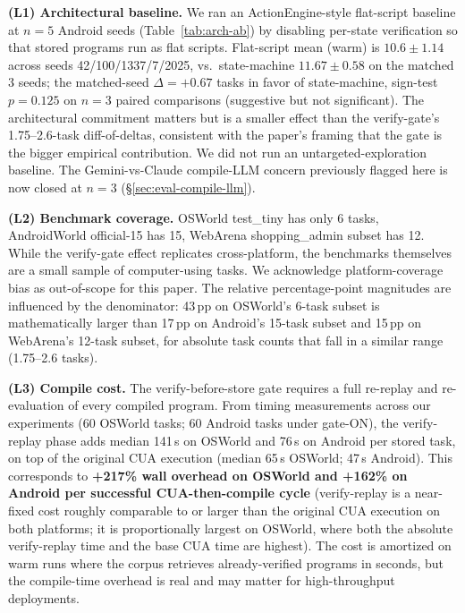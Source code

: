 \documentclass[11pt]{article}
\begin{document}
\textbf{(L1) Architectural baseline.} We ran an ActionEngine-style flat-script baseline at $n{=}5$ Android seeds (Table~\ref{tab:arch-ab}) by disabling per-state verification so that stored programs run as flat scripts. Flat-script mean (warm) is $10.6 \pm 1.14$ across seeds 42/100/1337/7/2025, vs.\ state-machine $11.67 \pm 0.58$ on the matched 3 seeds; the matched-seed $\Delta = +0.67$ tasks in favor of state-machine, sign-test $p = 0.125$ on $n{=}3$ paired comparisons (suggestive but not significant). The architectural commitment matters but is a smaller effect than the verify-gate's 1.75--2.6-task diff-of-deltas, consistent with the paper's framing that the gate is the bigger empirical contribution. We did not run an untargeted-exploration baseline. The Gemini-vs-Claude compile-LLM concern previously flagged here is now closed at $n{=}3$ (\S\ref{sec:eval-compile-llm}).

\textbf{(L2) Benchmark coverage.} OSWorld test\_tiny has only 6 tasks, AndroidWorld official-15 has 15, WebArena shopping\_admin subset has 12. While the verify-gate effect replicates cross-platform, the benchmarks themselves are a small sample of computer-using tasks. We acknowledge platform-coverage bias as out-of-scope for this paper. The relative percentage-point magnitudes are influenced by the denominator: 43\,pp on OSWorld's 6-task subset is mathematically larger than 17\,pp on Android's 15-task subset and 15\,pp on WebArena's 12-task subset, for absolute task counts that fall in a similar range (1.75--2.6 tasks).

\textbf{(L3) Compile cost.} The verify-before-store gate requires a full re-replay and re-evaluation of every compiled program. From timing measurements across our experiments (60 OSWorld tasks; 60 Android tasks under gate-ON), the verify-replay phase adds median 141\,s on OSWorld and 76\,s on Android per stored task, on top of the original CUA execution (median 65\,s OSWorld; 47\,s Android). This corresponds to \textbf{+217\% wall overhead on OSWorld and +162\% on Android per successful CUA-then-compile cycle} (verify-replay is a near-fixed cost roughly comparable to or larger than the original CUA execution on both platforms; it is proportionally largest on OSWorld, where both the absolute verify-replay time and the base CUA time are highest). The cost is amortized on warm runs where the corpus retrieves already-verified programs in seconds, but the compile-time overhead is real and may matter for high-throughput deployments.
\end{document}
